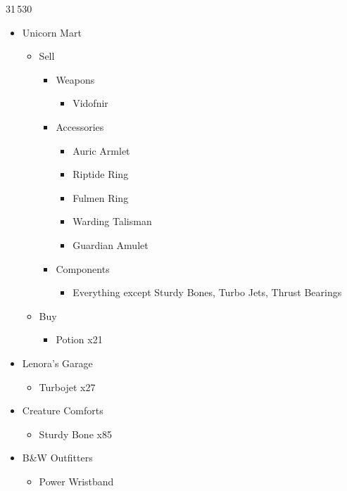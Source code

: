 \begin{shop}{31\,530}
\begin{multicols}{2}
\begin{itemize}
    \item Unicorn Mart
    \begin{itemize}
        \item Sell
        \begin{itemize}
            \item Weapons
            \begin{itemize}
                \item Vidofnir
            \end{itemize}
            \item Accessories
            \begin{itemize}
                \item Auric Armlet
                \item Riptide Ring
                \item Fulmen Ring
                \item Warding Talisman
                \item Guardian Amulet
            \end{itemize}
            \item Components
            \begin{itemize}
                \item Everything except Sturdy Bones, Turbo Jets, Thrust Bearings
            \end{itemize}
        \end{itemize}
        \item Buy
        \begin{itemize}
            \item Potion x21
        \end{itemize}
    \end{itemize}
    \columnbreak
    \item Lenora's Garage
    \begin{itemize}
        \item Turbojet x27
    \end{itemize}
    \item Creature Comforts
    \begin{itemize}
        \item Sturdy Bone x85
    \end{itemize}
    \item B\&W Outfitters
    \begin{itemize}
        \item Power Wristband
    \end{itemize}
\end{itemize}
\end{multicols}
\end{shop}
